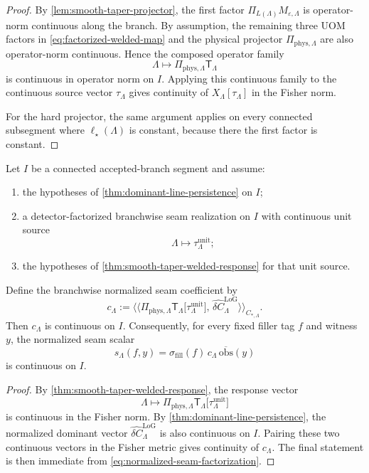 \documentclass[11pt]{article}
\begin{document}
\begin{proof}
By \cref{lem:smooth-taper-projector}, the first factor
\(
\Pi_{L(\Lambda)}M_{\varepsilon,\Lambda}
\)
is operator-norm continuous along the branch.
By assumption, the remaining three UOM factors in \eqref{eq:factorized-welded-map} and the physical
projector \(\Pi_{\mathrm{phys},\Lambda}\) are also operator-norm continuous.
Hence the composed operator family
\[
\Lambda\longmapsto
\Pi_{\mathrm{phys},\Lambda}\mathsf T_\Lambda
\]
is continuous in operator norm on \(I\).
Applying this continuous family to the continuous source vector \(\tau_\Lambda\) gives continuity of
\(
X_\Lambda[\tau_\Lambda]
\)
in the Fisher norm.

For the hard projector, the same argument applies on every connected subsegment where
\(\ell_\star(\Lambda)\) is constant, because there the first factor is constant.
\end{proof}

\begin{corollary}
\label{cor:branchwise-seam-coeff}
Let \(I\) be a connected accepted-branch segment and assume:
\begin{enumerate}[leftmargin=2em]
\item the hypotheses of \cref{thm:dominant-line-persistence} on \(I\);
\item a detector-factorized branchwise seam realization on \(I\) with continuous unit source
  \[
  \Lambda\longmapsto \tau^{\mathrm{unit}}_{\Lambda};
  \]
\item the hypotheses of \cref{thm:smooth-taper-welded-response} for that unit source.
\end{enumerate}
Define the branchwise normalized seam coefficient by
\begin{equation}
c_\Lambda
:=
\big\langle\!\big\langle
\Pi_{\mathrm{phys},\Lambda}\mathsf T_\Lambda\!\big[\tau^{\mathrm{unit}}_{\Lambda}\big],\,
\widehat{\delta C}^{\mathrm{LoG}}_{\Lambda}
\big\rangle\!\big\rangle_{C_{\ast,\Lambda}}.
\label{eq:branchwise-seam-coeff}
\end{equation}
Then \(c_\Lambda\) is continuous on \(I\).
Consequently, for every fixed filler tag \(f\) and witness \(y\), the normalized seam scalar
\[
s_\Lambda(f,y)
=
\sigma_{\mathrm{fill}}(f)\,
c_\Lambda\,
\overline{\mathrm{obs}}(y)
\]
is continuous on \(I\).
\end{corollary}

\begin{proof}
By \cref{thm:smooth-taper-welded-response}, the response vector
\[
\Lambda\longmapsto
\Pi_{\mathrm{phys},\Lambda}\mathsf T_\Lambda\!\big[\tau^{\mathrm{unit}}_{\Lambda}\big]
\]
is continuous in the Fisher norm.
By \cref{thm:dominant-line-persistence}, the normalized dominant vector
\(
\widehat{\delta C}^{\mathrm{LoG}}_{\Lambda}
\)
is also continuous on \(I\).
Pairing these two continuous vectors in the Fisher metric gives continuity of \(c_\Lambda\).
The final statement is then immediate from
\eqref{eq:normalized-seam-factorization}.
\end{proof}
\end{document}
